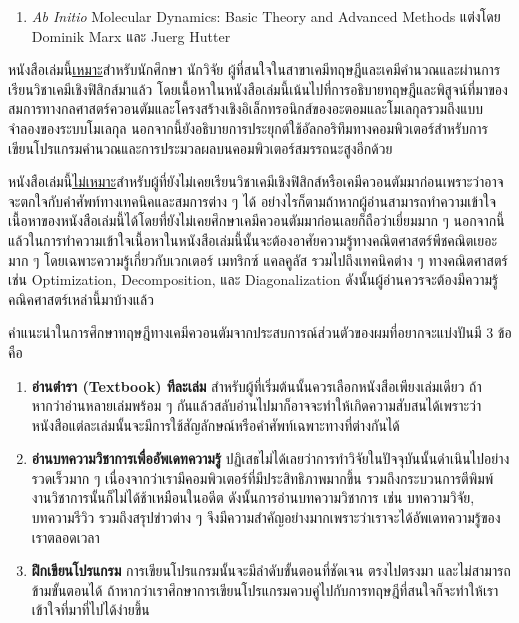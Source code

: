 {\begin{enumerate}[topsep=0pt,noitemsep]
    \item \textit{Ab Initio} Molecular Dynamics: Basic Theory and Advanced Methods
    แต่งโดย Dominik Marx และ Juerg Hutter\autocite{marx2009}
    
\end{enumerate}

หนังสือเล่มนี้\underline{เหมาะ}สำหรับนักศึกษา นักวิจัย ผู้ที่สนใจในสาขาเคมีทฤษฎีและเคมีคำนวณและผ่านการเรียนวิชาเคมีเชิงฟิสิกส์มาแล้ว โดยเนื้อหาในหนังสือเล่มนี้เน้นไปที่การอธิบายทฤษฎีและพิสูจน์ที่มาของสมการทางกลศาสตร์ควอนตัมและโครงสร้างเชิงอิเล็กทรอนิกส์ของอะตอมและโมเลกุลรวมถึงแบบจำลองของระบบโมเลกุล นอกจากนี้ยังอธิบายการประยุกต์ใช้อัลกอริทึมทางคอมพิวเตอร์สำหรับการเขียนโปรแกรมคำนวณและการประมวลผลบนคอมพิวเตอร์สมรรถนะสูงอีกด้วย

หนังสือเล่มนี้\underline{ไม่เหมาะ}สำหรับผู้ที่ยังไม่เคยเรียนวิชาเคมีเชิงฟิสิกส์หรือเคมีควอนตัมมาก่อนเพราะว่าอาจจะตกใจกับคำศัพท์ทางเทคนิคและสมการต่าง ๆ ได้ อย่างไรก็ตามถ้าหากผู้อ่านสามารถทำความเข้าใจเนื้อหาของหนังสือเล่มนี้ได้โดยที่ยังไม่เคยศึกษาเคมีควอนตัมมาก่อนเลยก็ถือว่าเยี่ยมมาก ๆ นอกจากนี้แล้วในการทำความเข้าใจเนื้อหาในหนังสือเล่มนี้นั้นจะต้องอาศัยความรู้ทางคณิตศาสตร์พีชคณิตเยอะมาก ๆ โดยเฉพาะความรู้เกี่ยวกับเวกเตอร์ เมทริกซ์ แคลคูลัส รวมไปถึงเทคนิคต่าง ๆ ทางคณิตศาสตร์ เช่น Optimization, Decomposition, และ Diagonalization ดังนั้นผู้อ่านควรจะต้องมีความรู้คณิคศาสตร์เหล่านี้มาบ้างแล้ว

คำแนะนำในการศึกษาทฤษฎีทางเคมีควอนตัมจากประสบการณ์ส่วนตัวของผมที่อยากจะแบ่งปันมี 3 ข้อคือ 

\begin{enumerate}[topsep=0pt,noitemsep]
    \setlength\itemsep{0.5em}
    \item \textbf{อ่านตำรา (Textbook) ทีละเล่ม} สำหรับผู้ที่เริ่มต้นนั้นควรเลือกหนังสือเพียงเล่มเดียว ถ้าหากว่าอ่านหลายเล่มพร้อม ๆ กันแล้วสลับอ่านไปมาก็อาจจะทำให้เกิดความสับสนได้เพราะว่าหนังสือแต่ละเล่มนั้นจะมีการใช้สัญลักษณ์หรือคำศัพท์เฉพาะทางที่ต่างกันได้
    
    \item \textbf{อ่านบทความวิชาการเพื่ออัพเดทความรู้} ปฏิเสธไม่ได้เลยว่าการทำวิจัยในปัจจุบันนั้นดำเนินไปอย่างรวดเร็วมาก ๆ เนื่องจากว่าเรามีคอมพิวเตอร์ที่มีประสิทธิภาพมากขึ้น รวมถึงกระบวนการตีพิมพ์งานวิชาการนั้นก็ไม่ได้ช้าเหมือนในอดีต ดังนั้นการอ่านบทความวิชาการ เช่น บทความวิจัย, บทความรีวิว รวมถึงสรุปข่าวต่าง ๆ จึงมีความสำคัญอย่างมากเพราะว่าเราจะได้อัพเดทความรู้ของเราตลอดเวลา

    \item \textbf{ฝึกเขียนโปรแกรม} การเขียนโปรแกรมนั้นจะมีลำดับขั้นตอนที่ชัดเจน ตรงไปตรงมา และไม่สามารถข้ามขั้นตอนได้ ถ้าหากว่าเราศึกษาการเขียนโปรแกรมควบคู่ไปกับการทฤษฎีที่สนใจก็จะทำให้เราเข้าใจที่มาที่ไปได้ง่ายขึ้น
\end{enumerate}

}
